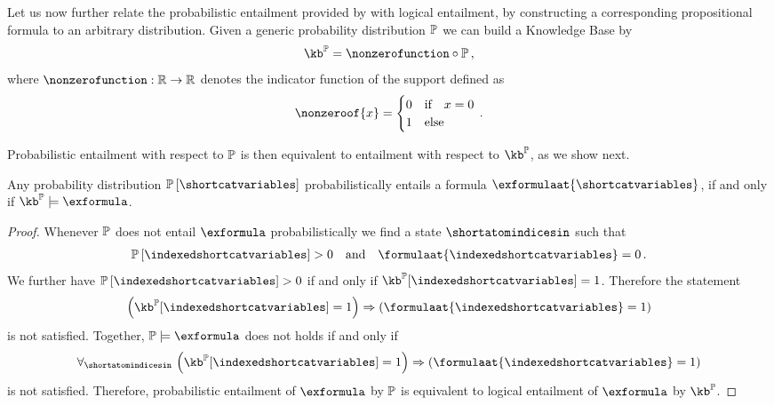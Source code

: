 
Let us now further relate the probabilistic entailment provided by  with logical entailment, by constructing a corresponding propositional formula to an arbitrary distribution.
Given a generic probability distribution $\mathbb{P}$ we can build a Knowledge Base by
\begin{align*}
    \kb^{\probtensor} = \nonzerofunction \circ \probtensor \, ,
\end{align*}
where $\nonzerofunction:\rr\rightarrow \rr$ denotes the indicator function of the support defined as
\begin{align}
    \nonzeroof{x}
    = \begin{cases}
          0 & \ifspace x=0 \\
          1 & \text{else}
    \end{cases} \, .
\end{align}

Probabilistic entailment with respect to $\mathbb{P}$ is then equivalent to entailment with respect to $\kb^{\probtensor}$, as we show next.

\begin{theorem}
    \label{the:entailmentProbToLogical}
    Any probability distribution $\probat{\shortcatvariables}$ probabilistically entails a formula $\exformulaat{\shortcatvariables}$, if and only if $\kb^{\probtensor}\models\exformula$.
\end{theorem}
\begin{proof}
    Whenever $\mathbb{P}$ does not entail $\exformula$ probabilistically we find a state $\shortatomindicesin$ such that
    \begin{align*}
        \probat{\indexedshortcatvariables} >0 \quad\text{and} \quad \formulaat{\indexedshortcatvariables} = 0 \, .
    \end{align*}
    We further have $\probat{\indexedshortcatvariables}>0$ if and only if $\kb^{\probtensor}[\indexedshortcatvariables]=1$.
    Therefore the statement
    \begin{align*}
        \imppremhead{\kb^{\probtensor}[\indexedshortcatvariables]=1}{\formulaat{\indexedshortcatvariables}=1}
    \end{align*}
    is not satisfied.
    Together, $\probtensor\models\exformula$ does not holds if and only if
    \begin{align*}
        \uniquantwrtof{\shortatomindicesin}{\imppremhead{\kb^{\probtensor}[\indexedshortcatvariables]=1}{\formulaat{\indexedshortcatvariables}=1}}
    \end{align*}
    is not satisfied.
    Therefore, probabilistic entailment of $\exformula$ by $\mathbb{P}$ is equivalent to logical entailment of $\exformula$ by $\kb^{\probtensor}$.
\end{proof}

